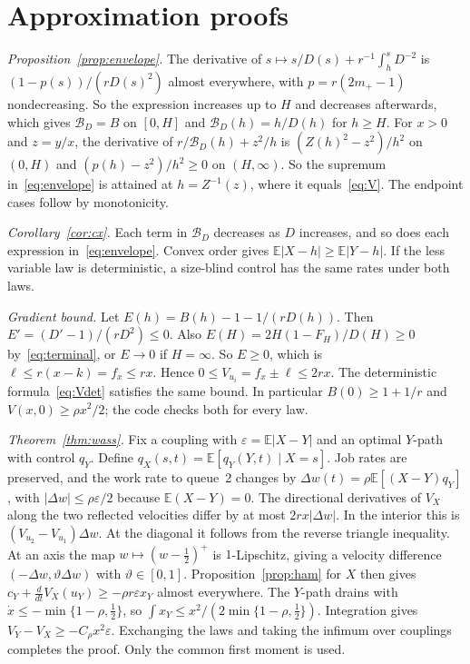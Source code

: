 \documentclass[11pt]{article}
\numberwithin{equation}{section}
\theoremstyle{definition}
\theoremstyle{remark}
\newcommand{\E}{\mathbb{E}}
\begin{document}
\section{Approximation proofs}\label{app:approx}

\emph{Proposition~\ref{prop:envelope}.} The derivative of $s\mapsto s/D(s)+r^{-1}\int_h^sD^{-2}$ is $(1-p(s))/(rD(s)^2)$ almost everywhere, with $p=r(2m_+-1)$ nondecreasing. So the expression increases up to $H$ and decreases afterwards, which gives $\mathcal B_D=B$ on $[0,H]$ and $\mathcal B_D(h)=h/D(h)$ for $h\ge H$. For $x>0$ and $z=y/x$, the derivative of $r/\mathcal B_D(h)+z^2/h$ is $(Z(h)^2-z^2)/h^2$ on $(0,H)$ and $(p(h)-z^2)/h^2\ge0$ on $(H,\infty)$. So the supremum in~\eqref{eq:envelope} is attained at $h=Z^{-1}(z)$, where it equals~\eqref{eq:V}. The endpoint cases follow by monotonicity.

\emph{Corollary~\ref{cor:cx}.} Each term in $\mathcal B_D$ decreases as $D$ increases, and so does each expression in~\eqref{eq:envelope}. Convex order gives $\E|X-h|\ge\E|Y-h|$. If the less variable law is deterministic, a size-blind control has the same rates under both laws.

\emph{Gradient bound.} Let $E(h)=B(h)-1-1/(rD(h))$. Then $E'=(D'-1)/(rD^2)\le0$. Also $E(H)=2H(1-F_H)/D(H)\ge0$ by~\eqref{eq:terminal}, or $E\to0$ if $H=\infty$. So $E\ge0$, which is $\ell\le r(x-k)=f_x\le rx$. Hence $0\le V_{u_i}=f_x\pm\ell\le2rx$. The deterministic formula~\eqref{eq:Vdet} satisfies the same bound. In particular $B(0)\ge1+1/r$ and $V(x,0)\ge\rho x^2/2$; the code checks both for every law.

\emph{Theorem~\ref{thm:wass}.} Fix a coupling with $\varepsilon=\E|X-Y|$ and an optimal $Y$-path with control $q_Y$. Define $q_X(s,t)=\E[q_Y(Y,t)\mid X=s]$. Job rates are preserved, and the work rate to queue~2 changes by $\Delta w(t)=\rho\E[(X-Y)q_Y]$, with $|\Delta w|\le\rho\varepsilon/2$ because $\E(X-Y)=0$. The directional derivatives of $V_X$ along the two reflected velocities differ by at most $2rx|\Delta w|$. In the interior this is $(V_{u_2}-V_{u_1})\Delta w$. At the diagonal it follows from the reverse triangle inequality. At an axis the map $w\mapsto(w-\frac12)^+$ is $1$-Lipschitz, giving a velocity difference $(-\Delta w,\vartheta\Delta w)$ with $\vartheta\in[0,1]$. Proposition~\ref{prop:ham} for $X$ then gives $c_Y+\frac{d}{dt}V_X(u_Y)\ge-\rho r\varepsilon x_Y$ almost everywhere. The $Y$-path drains with $\dot x\le-\min\{1-\rho,\frac12\}$, so $\int x_Y\le x^2/(2\min\{1-\rho,\frac12\})$. Integration gives $V_Y-V_X\ge-C_\rho x^2\varepsilon$. Exchanging the laws and taking the infimum over couplings completes the proof. Only the common first moment is used.
\end{document}
